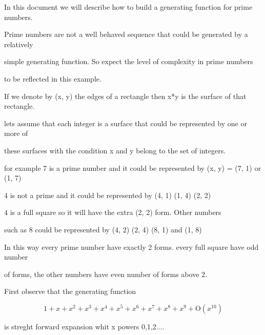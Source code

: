 \documentclass{article}
\begin{document}
\begin{maplegroup}
In this document we will describe how to build a generating function
for prime numbers.  

Prime numbers are not a well behaved sequence that could be generated
by a relatively 

simple generating function.  So expect the  level of complexity in
prime numbers 

to be reflected in this example.  

If we denote by (x, y) the edges of a rectangle then x*y is the
surface of that rectangle.

lets assume that each integer is a surface that could be represented
by one or more of 

these surfaces with the condition x and y belong to the set of
integers.

for example 7 is a prime number and it could be represented by (x, y)
= (7, 1) or (1, 7)

4 is not a prime and it could be represented by (4, 1)  (1, 4)  (2, 2)

4 is a full square so it will have the extra (2, 2) form.  Other
numbers

such as 8 could be represented by (4, 2)  (2, 4)  (8, 1) and (1, 8)

In this way every prime number have exactly 2 forms. every full square
have odd number

of forms,  the other numbers have even number of forms above 2.

First observe that the generating function

\end{maplegroup}
\begin{maplegroup}
\begin{mapleinput}
\end{mapleinput}

\mapleresult
\begin{maplelatex}
\[
1 + x + x^{2} + x^{3} + x^{4} + x^{5} + x^{6} + x^{7} + x^{8} + x
^{9} + \mathrm{O}(x^{10})
\]
\end{maplelatex}

\end{maplegroup}
\begin{maplegroup}
is streght forward expansion whit x  powers  0,1,2....

\end{maplegroup}
\begin{maplegroup}
\begin{mapleinput}
\end{mapleinput}

\end{maplegroup}
\end{document}
